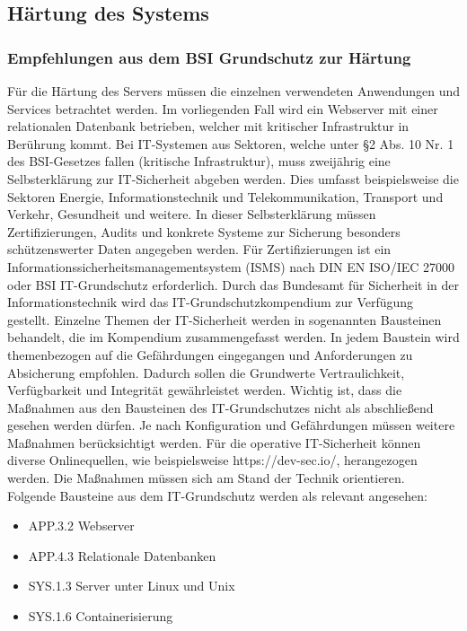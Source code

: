 \newpage
\subsection{Härtung des Systems}\label{kap:haertung_des_systems}


\subsubsection{Empfehlungen aus dem BSI Grundschutz zur Härtung}

F\"ur die H\"artung des Servers m\"ussen die einzelnen verwendeten Anwendungen und Services betrachtet werden. Im vorliegenden Fall wird ein Webserver mit einer relationalen Datenbank betrieben, welcher mit kritischer Infrastruktur in Ber\"uhrung kommt. Bei IT-Systemen aus Sektoren, welche unter \S2 Abs. 10 Nr. 1 des BSI-Gesetzes fallen (kritische Infrastruktur), muss zweij\"ahrig eine Selbsterkl\"arung zur IT-Sicherheit abgeben werden. Dies umfasst beispielsweise die Sektoren Energie, Informationstechnik und Telekommunikation, Transport und Verkehr, Gesundheit und weitere. In dieser Selbsterkl\"arung m\"ussen Zertifizierungen, Audits und konkrete Systeme zur Sicherung besonders sch\"utzenswerter Daten angegeben werden. F\"ur Zertifizierungen ist ein Informationssicherheitsmanagementsystem (ISMS) nach DIN EN ISO/IEC 27000 oder BSI IT-Grundschutz erforderlich. Durch das Bundesamt f\"ur Sicherheit in der Informationstechnik wird das IT-Grundschutzkompendium zur Verf\"ugung gestellt. Einzelne Themen der IT-Sicherheit werden in sogenannten Bausteinen behandelt, die im Kompendium zusammengefasst werden. In jedem Baustein wird themenbezogen auf die Gef\"ahrdungen eingegangen und Anforderungen zu Absicherung empfohlen. Dadurch sollen die Grundwerte Vertraulichkeit, Verf\"ugbarkeit und Integrit\"at gew\"ahrleistet werden. Wichtig ist, dass die Ma{\ss}nahmen aus den Bausteinen des IT-Grundschutzes nicht als abschlie{\ss}end gesehen werden d\"urfen. Je nach Konfiguration und Gef\"ahrdungen m\"ussen weitere Ma{\ss}nahmen ber\"ucksichtigt werden. F\"ur die operative IT-Sicherheit k\"onnen diverse Onlinequellen, wie beispielsweise https://dev-sec.io/, herangezogen werden. Die Ma{\ss}nahmen m\"ussen sich am Stand der Technik orientieren. \\

Folgende Bausteine aus dem IT-Grundschutz werden als relevant angesehen:
  \begin{itemize}
      \item APP.3.2 Webserver
			\item APP.4.3 Relationale Datenbanken
      \item SYS.1.3 Server unter Linux und Unix
			\item SYS.1.6 Containerisierung
   \end{itemize} 

